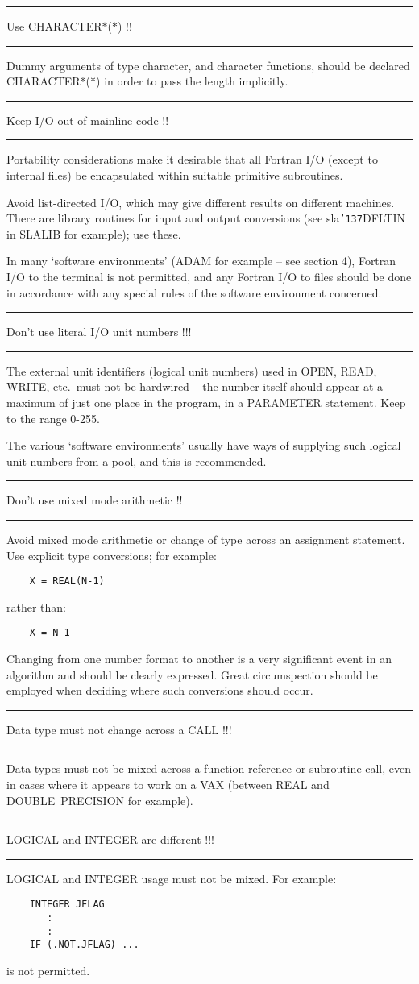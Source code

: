 \documentclass[twoside,11pt]{article}
\newcounter{sruleno}
\newcommand{\srule}[1]{
    \addtocounter{sruleno}{1}
    \goodbreak
    \rule[0.5ex]{\textwidth}{0.3mm}
    {\Large #1 \hfill {\thesruleno}}
    \rule[0.5ex]{\textwidth}{0.1mm}
}
\newcommand{\srule}[1]{
       \addtocounter{sruleno}{1}
       \begin{rawhtml} <HR> \end{rawhtml}
       {\Large \thesruleno}~~~~{\Large #1}
       \begin{rawhtml} <HR> \end{rawhtml}
       \end{tabular}
  }
\renewcommand{\_}{{\tt\char'137}}
\begin{document}
\srule{Use CHARACTER$\ast$($\ast$) !!}
Dummy arguments of type character, and character functions, should be declared
CHARACTER*(*) in order to pass the length implicitly.

\srule{Keep I/O out of mainline code !!}
Portability considerations make it desirable that all Fortran I/O (except to
internal files) be encapsulated within suitable primitive subroutines.

Avoid list-directed I/O, which may give different results on different machines.
There are library routines for input and output conversions
(see sla\_DFLTIN in SLALIB for example); use these.

In many `software environments' (ADAM for example -- see section 4), Fortran
I/O to the terminal is not permitted, and any Fortran I/O to files should be
done in accordance with any special rules of the software environment concerned.

\srule{Don't use literal I/O unit numbers !!!}
The external unit identifiers (logical unit numbers) used in OPEN, READ, WRITE,
etc.\ must not be hardwired -- the number itself should appear at a
maximum of just one place in the program, in a PARAMETER statement.
Keep to the range 0-255.

The various `software environments' usually have ways of supplying such logical
unit numbers from a pool, and this is recommended.

\srule{Don't use mixed mode arithmetic !!}
Avoid mixed mode arithmetic or change of type across an assignment statement.
Use explicit type conversions; for example:
\begin{verbatim}
    X = REAL(N-1)
\end{verbatim}
rather than:
\begin{verbatim}
    X = N-1
\end{verbatim}

Changing from one number format to another is a very significant
event in an algorithm and should be clearly expressed.  Great
circumspection should be employed when deciding where such
conversions should occur.

\srule{Data type must not change across a CALL !!!}
Data types must not be mixed across a function reference or subroutine call,
even in cases where it appears to work on a VAX (between REAL and
DOUBLE~PRECISION for example).

\srule{LOGICAL and INTEGER are different !!!}
LOGICAL and INTEGER usage must not be mixed.  For example:
\begin{verbatim}
    INTEGER JFLAG
       :
       :
    IF (.NOT.JFLAG) ...
\end{verbatim}
is not permitted.
\end{document}

